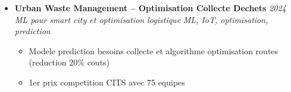 \documentclass[a4paper,11pt]{article}
\begin{document}
\begin{itemize}[leftmargin=*, label={-}]
\item \textbf{Urban Waste Management -- Optimisation Collecte Dechets} \hfill \textit{2024} \\
\textit{ML pour smart city et optimisation logistique} \hfill \textit{ML, IoT, optimisation, prediction}
\vspace{-2pt}
    \begin{itemize}[leftmargin=0.4cm, nosep, label=\tiny$\bullet$]
        \item \small{Modele prediction besoins collecte et algorithme optimisation routes (reduction 20\% couts)}
        \item \small{1er prix competition CITS avec 75 equipes}
    \end{itemize}

\end{itemize}
\end{document}
